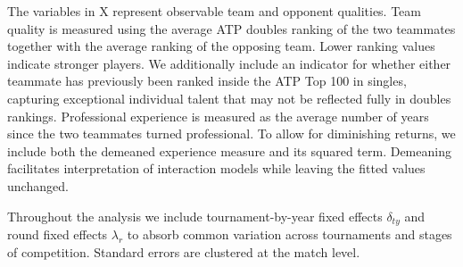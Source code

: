 \documentclass[10pt]{article}
\begin{document}
The variables in X  represent observable team and opponent qualities. Team quality is measured using the average ATP doubles ranking of the two teammates together with the average ranking of the opposing team. Lower ranking values indicate stronger players. We additionally include an indicator for whether either teammate has previously been ranked inside the ATP Top 100 in singles, capturing exceptional individual talent that may not be reflected fully in doubles rankings. Professional experience is measured as the average number of years since the two teammates turned professional. To allow for diminishing returns, we include both the demeaned experience measure and its squared term. Demeaning facilitates interpretation of interaction models while leaving the fitted values unchanged.

Throughout the analysis we include tournament-by-year fixed effects $\delta_{ty}$ and round fixed effects $\lambda_r$ to absorb common variation across tournaments and stages of competition. Standard errors are clustered at the match level.
\end{document}
